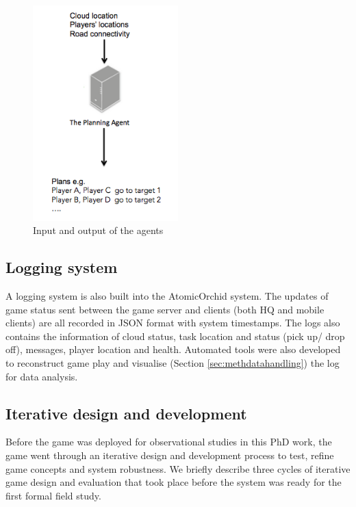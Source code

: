 \begin{figure}[h]
  \centering
  \includegraphics[width=0.5\textwidth]{img/approach/inputoutput}
  \caption{Input and output of the agents}
  \label{fig:inputoutput}
\end{figure}

\subsection{Logging system} \label{sec:applogging}
A logging system is also built into the AtomicOrchid system. The updates of game status sent between the game server and clients (both HQ and mobile clients) are all recorded in JSON format with system timestamps. The logs also contains the information of cloud status, task location and status (pick up/ drop off), messages, player location and health. Automated tools were also developed to reconstruct game play and visualise (Section \ref{sec:methdatahandling}) the log for data analysis. %

\subsection{Iterative design and development}
Before the game was deployed for observational studies in this PhD work, the game went through an iterative design and development process to test, refine game concepts and system robustness. We briefly describe three cycles of iterative game design and evaluation that took place before the system was ready for the first formal field study.\\

